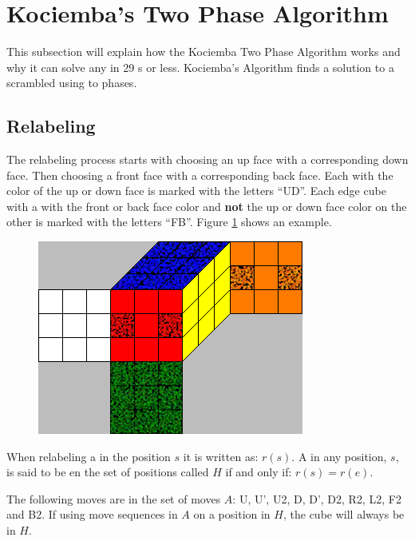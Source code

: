 \section{Kociemba's Two Phase Algorithm}
This subsection will explain how the Kociemba Two Phase Algorithm works and why it can solve any \rubik{} in 29 \twist{}s or less. Kociemba's Algorithm finds a solution to a scrambled \rubik{} using to phases.

\subsection{Relabeling}
The relabeling process  starts with choosing an up face with a corresponding down face. Then choosing a front face with a corresponding back face. Each \facelet{} with the color of the up or down face is marked with the letters ``UD''. Each edge cube with a \facelet{} with the front or back face color and \textbf{not} the up or down face color on the other \facelet{} is marked with the letters ``FB''. Figure \ref{fig:relabel1} shows an example.

\begin{figure}[hb]
	\centering
		\includegraphics{input/pics/relabel1}
	\caption{}
	\label{fig:relabel1}
\end{figure}

When relabeling a \rubik{} in the position $s$ it is written as: $r(s)$. A \rubik{} in any position, $s$, is said to be en the set of positions called $H$ if and only if: $r(s)=r(e)$.

The following moves are in the set of moves $A$: U, U', U2, D, D', D2, R2, L2, F2 and B2. If using move sequences in $A$ on a position in $H$, the cube will always be in $H$.
